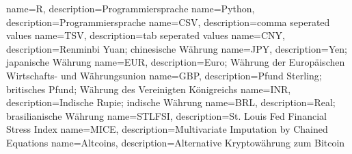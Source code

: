 {
    name=R,
    description={Programmiersprache}
}
{
    name=Python,
    description={Programmiersprache}
}
{
    name=CSV,
    description={comma seperated values}
}
{
    name=TSV,
    description={tab seperated values}
}
{
    name=CNY,
    description={Renminbi Yuan; chinesische Währung}
}
{
    name=JPY,
    description={Yen; japanische Währung}
}
{
    name=EUR,
    description={Euro; Währung der Europäischen Wirtschafts- und Währungsunion}
}
{
    name=GBP,
    description={Pfund Sterling; britisches Pfund; Währung des Vereinigten Königreichs}
}
{
    name=INR,
    description={Indische Rupie; indische Währung}
}
{
    name=BRL,
    description={Real; brasilianische Währung}
}
{
    name=STLFSI,
    description={St. Louis Fed Financial Stress Index}
}
{
    name=MICE,
    description={Multivariate Imputation by Chained Equations}
}
{
    name=Altcoins,
    description={Alternative Kryptowährung zum Bitcoin}
}
